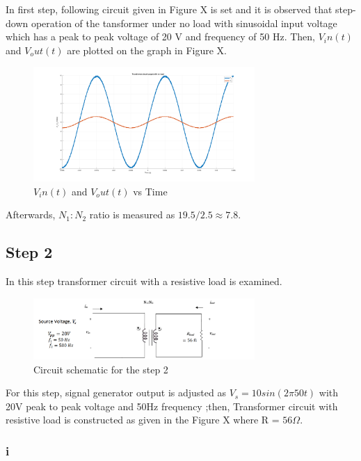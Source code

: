 \documentclass[letterpaper,12pt]{article}
\begin{document}
In first step, following circuit given in Figure X is set and it is observed that step-down operation of the tansformer under no load with sinusoidal input voltage which has a peak to peak voltage of 20 V and frequency of
50 Hz. Then, \(V_in(t) \) and \(V_out(t)\) are plotted on the graph in Figure X.
\begin{figure}[H]
    \centering
    \includegraphics[width = 0.75\textwidth]{1_1.png}
    \caption{\(V_in(t) \) and \(V_out(t)\) vs Time}
\end{figure} 
Afterwards, \(N_1:N_2\) ratio is measured as \(19.5/2.5 \approx 7.8 \).

%
\subsection{Step 2}
In this step transformer circuit with a resistive load is examined.
\begin{figure}[H]
    \centering
    \includegraphics[width = 0.75\textwidth]{2.png}
    \caption{Circuit schematic for the step 2}
\end{figure} 

For this step, signal generator output is adjusted as \(V_s = 10sin(2\pi50t)\) with 20V peak to peak voltage and 50Hz frequency ;then, Transformer circuit with resistive load is constructed as given in the Figure X where R = \(56\Omega \).  
\subsubsection{i}
\end{document}
